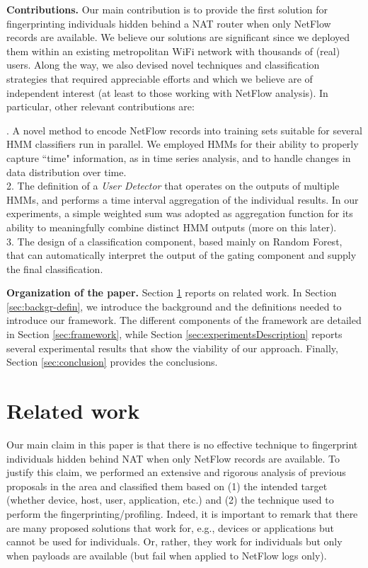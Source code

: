 \documentclass[10pt,conference,compsocconf,letterpaper]{IEEEtran}
\begin{document}
{\bf Contributions.} 
Our main contribution is to provide the first solution for fingerprinting individuals hidden behind a NAT router when only NetFlow records are available.
We believe our solutions are significant since we deployed them within an existing metropolitan WiFi network with thousands of (real) users. 
Along the way, we also devised novel techniques and classification strategies that required appreciable efforts and which we believe are of independent interest (at least to those working with NetFlow analysis). 
In particular, other relevant contributions are:

. A novel method to encode NetFlow records into training sets suitable for several HMM classifiers 
run in parallel. We employed HMMs for their ability to properly capture ``time" information, as in time series analysis, and to handle changes in data distribution over time.\\
2. The definition of a {\em User Detector} that operates on the outputs of multiple HMMs, and
performs a time interval aggregation of the individual results. In our experiments, a simple weighted sum was adopted as aggregation function for its ability to meaningfully combine distinct HMM outputs (more on this later). \\
3. The design of a classification component, based mainly on Random Forest, that can automatically interpret the output of the gating component and supply the final classification.  

{\bf Organization of the paper.}
Section \ref{sec:related} reports on related work.
In Section \ref{sec:backgr-defin}, we introduce the background and the definitions needed to introduce our framework. 
The different components of the framework are detailed in Section \ref{sec:framework}, while Section \ref{sec:experimentsDescription} reports several experimental results that show the viability of our approach. Finally, Section \ref{sec:conclusion} provides the conclusions.





\section{Related work}
\label{sec:related}
Our main claim in this paper is that there is no effective technique to fingerprint individuals
hidden behind NAT when only NetFlow records are available. To justify this claim, we performed
an extensive and rigorous analysis of previous proposals in the area and classified them 
based on (1) the intended target (whether device, host, user, application, etc.) and (2) the technique 
used to perform the fingerprinting/profiling. 
Indeed, it is important to remark that there are many proposed solutions that work for, e.g., devices or applications but cannot be used for individuals. Or, rather, they work for individuals but only when payloads are available (but fail when applied to NetFlow logs only).  
\end{document}
